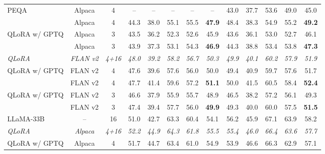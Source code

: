 \begin{table*}[!t]
{{\begin{tabular}{lcc:ccccc:ccccc}
   PEQA         & Alpaca & 4  & -- & -- & -- & -- & -- & 43.0 & 37.7 & 53.6 & 49.0 & 45.0 \\
   \ours{}      & Alpaca & 4  & 44.3 & 38.0 & 55.1 & 55.5 & \textbf{47.9} & 48.4 & 38.3 & 54.9 & 55.2 & \textbf{49.2} \\
   QLoRA w/ GPTQ & Alpaca & 3  & 43.5 & 36.2 & 52.3 & 52.6 & 45.9 & 43.6 & 36.1 & 53.0 & 52.7 & 46.1 \\
   \ours{}      & Alpaca & 3  & 43.9 & 37.3 & 53.1 & 54.3 & \textbf{46.9} & 44.3 & 38.8 & 53.4 & 53.8 & \textbf{47.3} \\
\noalign{\vspace{0.1em}}\hdashline[0.8pt/1pt]\noalign{\vspace{0.1em}}
   \textit{QLoRA} & \textit{FLAN v2} & \textit{4+16} & \textit{48.0} & \textit{39.2} & \textit{58.2} & \textit{56.7} & \textit{50.3} & \textit{49.9} & \textit{40.1} & \textit{60.2} & \textit{57.9} & \textit{51.9} \\
\noalign{\vspace{0.1em}}\hdashline[0.8pt/1pt]\noalign{\vspace{0.1em}}
   QLoRA w/ GPTQ & FLAN v2 & 4  & 47.6 & 39.6 & 57.6 & 56.0 & 50.0 & 49.4 & 40.9 & 59.7 & 57.6 & 51.7 \\
   \ours{}      & FLAN v2 & 4  & 47.7 & 41.4 & 59.6 & 57.2 & \textbf{51.1} & 50.0 & 41.5 & 60.5 & 58.4 & \textbf{52.4} \\
   QLoRA w/ GPTQ & FLAN v2 & 3  & 46.6 & 37.9 & 55.9 & 55.7 & 48.9 & 46.5 & 38.2 & 57.2 & 56.1 & 49.3 \\
   \ours{}      & FLAN v2 & 3  & 47.4 & 39.4 & 57.7 & 56.0 & \textbf{49.9} & 49.3 & 40.0 & 60.0 & 57.5 & \textbf{51.5} \\
\midrule
  LLaMA-33B & -- & 16 & 51.0 & 42.7 & 63.3 & 60.4 & 54.1 & 56.2 & 45.9 & 67.1 & 63.9 & 58.2 \\
\noalign{\vspace{0.1em}}\hdashline[0.8pt/1pt]\noalign{\vspace{0.1em}}
  \textit{QLoRA} & \textit{Alpaca} & \textit{4+16} & \textit{52.2} & \textit{44.9} & \textit{64.3} & \textit{61.8} & \textit{55.5} & \textit{55.4} & \textit{46.0} & \textit{66.4} & \textit{63.6} & \textit{57.7} \\
\noalign{\vspace{0.1em}}\hdashline[0.8pt/1pt]\noalign{\vspace{0.1em}}
  QLoRA w/ GPTQ & Alpaca & 4  & 51.7 & 44.7 & 63.4 & 61.0 & 54.9 & 53.9 & 46.6 & 66.3 & 62.9 & 57.1 \\

\end{tabular}}}
\end{table*}
